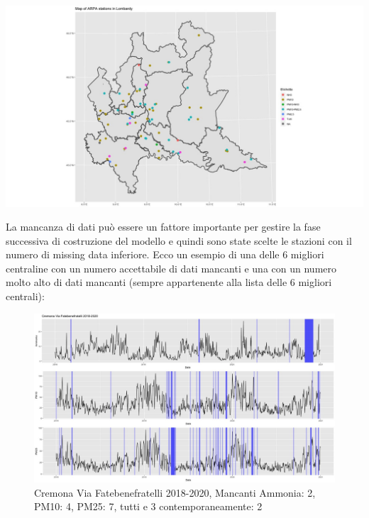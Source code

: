 \documentclass{article}
\begin{document}
\includegraphics[scale=0.35]{Picture/mappina.jpeg}

La mancanza di dati può essere un fattore importante per gestire la fase successiva di 
costruzione del modello
e quindi sono state scelte le stazioni con il numero di missing data inferiore.
Ecco un esempio di una  delle 6 migliori centraline con un numero accettabile di dati mancanti e una con
un numero molto alto di dati mancanti (sempre appartenente alla lista delle 6 migliori centrali):

\begin{figure}[H]
    \centering
    \includegraphics[scale=0.35]{Picture/Cremona Via Fatebenefratelli 2018-2020 .jpeg} 
    \caption{Cremona Via Fatebenefratelli 2018-2020, Mancanti Ammonia: 2, PM10: 4, PM25: 7, tutti e 3 contemporaneamente: 2}
    \centering
\end{figure}
\end{document}
